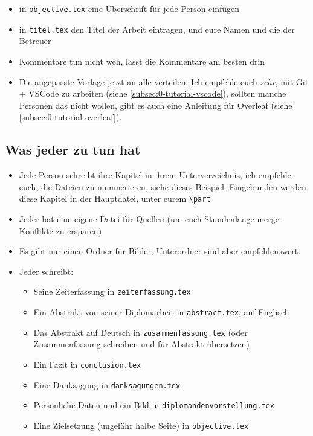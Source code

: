 \begin{itemize}
    \item in \verb|objective.tex| eine Überschrift für jede Person einfügen
    \item in \verb|titel.tex| den Titel der Arbeit eintragen, und eure Namen und die der Betreuer
    \item Kommentare tun nicht weh, lasst die Kommentare am besten drin
    \item Die angepasste Vorlage jetzt an alle verteilen. Ich empfehle euch \emph{sehr}, mit Git + VSCode zu arbeiten (siehe \ref{subsec:0-tutorial-vscode}), sollten manche Personen das nicht wollen, gibt es auch eine Anleitung für Overleaf (siehe \ref{subsec:0-tutorial-overleaf}).
\end{itemize}

\subsection{Was jeder zu tun hat}

\begin{itemize}
    \item Jede Person schreibt ihre Kapitel in ihrem Unterverzeichnis, ich empfehle euch, die Dateien zu nummerieren, siehe dieses Beispiel. Eingebunden werden diese Kapitel in der Hauptdatei, unter eurem \verb|\part|
    \item Jeder hat eine eigene Datei für Quellen (um euch Stundenlange merge-Konflikte zu ersparen)
    \item Es gibt nur einen Ordner für Bilder, Unterordner sind aber empfehlenswert.
    \item Jeder schreibt:
    \begin{itemize}
        \item Seine Zeiterfassung in \verb|zeiterfassung.tex|
        \item Ein Abstrakt von seiner Diplomarbeit in \verb|abstract.tex|, auf Englisch
        \item Das Abstrakt auf Deutsch in \verb|zusammenfassung.tex| (oder Zusammenfassung schreiben und für Abstrakt übersetzen)
        \item Ein Fazit in \verb|conclusion.tex|
        \item Eine Danksagung in \verb|danksagungen.tex|
        \item Persönliche Daten und ein Bild in \verb|diplomandenvorstellung.tex|
        \item Eine Zielsetzung (ungefähr halbe Seite) in \verb|objective.tex|
    \end{itemize}
\end{itemize}

